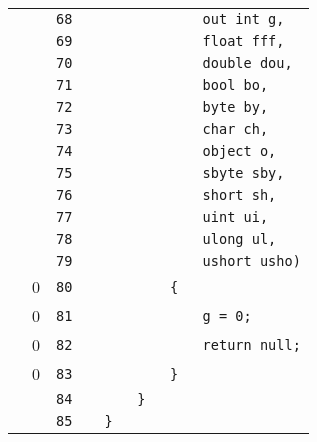 \documentclass[a4paper,landscape,10pt]{article}
\begin{document}
\begin{longtable}[l]{lrrll}
\cellcolor{gray} &  & \verb~68~ & & \verb~            out int g,~\\
\cellcolor{gray} &  & \verb~69~ & & \verb~            float fff,~\\
\cellcolor{gray} &  & \verb~70~ & & \verb~            double dou,~\\
\cellcolor{gray} &  & \verb~71~ & & \verb~            bool bo,~\\
\cellcolor{gray} &  & \verb~72~ & & \verb~            byte by,~\\
\cellcolor{gray} &  & \verb~73~ & & \verb~            char ch,~\\
\cellcolor{gray} &  & \verb~74~ & & \verb~            object o,~\\
\cellcolor{gray} &  & \verb~75~ & & \verb~            sbyte sby,~\\
\cellcolor{gray} &  & \verb~76~ & & \verb~            short sh,~\\
\cellcolor{gray} &  & \verb~77~ & & \verb~            uint ui,~\\
\cellcolor{gray} &  & \verb~78~ & & \verb~            ulong ul,~\\
\cellcolor{gray} &  & \verb~79~ & & \verb~            ushort usho)~\\
\cellcolor{red} & 0 & \verb~80~ & & \verb~        {~\\
\cellcolor{red} & 0 & \verb~81~ & & \verb~            g = 0;~\\
\cellcolor{red} & 0 & \verb~82~ & & \verb~            return null;~\\
\cellcolor{red} & 0 & \verb~83~ & & \verb~        }~\\
\cellcolor{gray} &  & \verb~84~ & & \verb~    }~\\
\cellcolor{gray} &  & \verb~85~ & & \verb~}~\\
\end{longtable}
\end{document}
